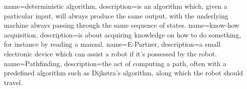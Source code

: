 {
  name=deterministic algorithm,
  description={is an algorithm which, given a particular input,
  		 will always produce the same output, with the 
  		 underlying machine always passing through 
  		 the same sequence of states. }
}
{
  name=know-how acquisition,
  description={is about acquiring knowledge on how to do something, for 				instance by reading a manual. }
}
{
  name=E-Partner,
  description={a small electronic device which can assist a robot if it's 			possessed by the robot. }
}
{
  name=Pathfinding,
  description={the act of computing a path, often with a predefined 					algorithm such as Dijkstra's algorithm, along which the robot 			should travel. }
}